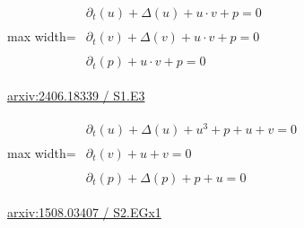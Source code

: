 \documentclass[UTF8,10pt,a4paper,fontset=mac]{ctexart}
\begin{document}
\begin{minipage}{\linewidth}\begin{center}\begin{adjustbox}{max width=\linewidth}$\displaystyle\begin{gathered}\begin{gathered}\partial_{t}(u)+\Delta(u)+u\cdot v+p=0\end{gathered}\\[5pt]\begin{gathered}\partial_{t}(v)+\Delta(v)+u\cdot v+p=0\end{gathered}\\[5pt]\begin{gathered}\partial_{t}(p)+u\cdot v+p=0\end{gathered}\end{gathered}$\end{adjustbox}\end{center}{\small\href{https://arxiv.org/html/2406.18339#S1.E3}{arxiv:2406.18339 / S1.E3}}\par\end{minipage}\par\vspace{6mm}

\begin{minipage}{\linewidth}\begin{center}\begin{adjustbox}{max width=\linewidth}$\displaystyle\begin{gathered}\begin{gathered}\partial_{t}(u)+\Delta(u)+u^{3}+p+u+v=0\end{gathered}\\[5pt]\begin{gathered}\partial_{t}(v)+u+v=0\end{gathered}\\[5pt]\begin{gathered}\partial_{t}(p)+\Delta(p)+p+u=0\end{gathered}\end{gathered}$\end{adjustbox}\end{center}{\small\href{https://arxiv.org/html/1508.03407#S2.EGx1}{arxiv:1508.03407 / S2.EGx1}}\par\end{minipage}\par\vspace{6mm}
\end{document}
